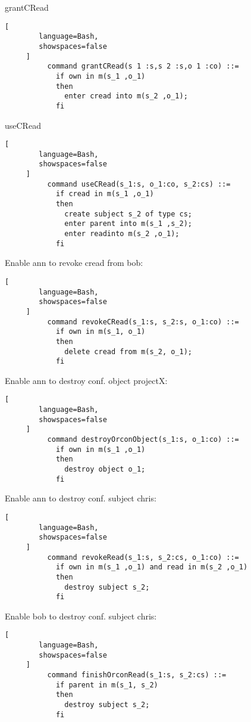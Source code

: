 \documentclass[a4paper]{article}
\begin{document}
\begin{multicols}{3}
\begin{itemize*}
        \item grantCRead
              \begin{lstlisting}[
        language=Bash,
        showspaces=false
     ]
          command grantCRead(s 1 :s,s 2 :s,o 1 :co) ::=
            if own in m(s_1 ,o_1)
            then
              enter cread into m(s_2 ,o_1);
            fi 
        \end{lstlisting}

        \item useCRead
              \begin{lstlisting}[
        language=Bash,
        showspaces=false
     ]
          command useCRead(s_1:s, o_1:co, s_2:cs) ::=
            if cread in m(s_1 ,o_1)
            then
              create subject s_2 of type cs;
              enter parent into m(s_1 ,s_2);
              enter readinto m(s_2 ,o_1);
            fi
        \end{lstlisting}

        \item Enable ann to revoke cread from bob:
              \begin{lstlisting}[
        language=Bash,
        showspaces=false
     ]
          command revokeCRead(s_1:s, s_2:s, o_1:co) ::=
            if own in m(s_1, o_1)
            then
              delete cread from m(s_2, o_1);
            fi
        \end{lstlisting}
        \item Enable ann to destroy conf. object projectX:
              \begin{lstlisting}[
        language=Bash,
        showspaces=false
     ]
          command destroyOrconObject(s_1:s, o_1:co) ::=
            if own in m(s_1 ,o_1)
            then
              destroy object o_1;
            fi 
        \end{lstlisting}
        \item Enable ann to destroy conf. subject chris:
              \begin{lstlisting}[
        language=Bash,
        showspaces=false
     ]
          command revokeRead(s_1:s, s_2:cs, o_1:co) ::= 
            if own in m(s_1 ,o_1) and read in m(s_2 ,o_1)
            then
              destroy subject s_2;
            fi
        \end{lstlisting}
        \item Enable bob to destroy conf. subject chris:
              \begin{lstlisting}[
        language=Bash,
        showspaces=false
     ]
          command finishOrconRead(s_1:s, s_2:cs) ::= 
            if parent in m(s_1, s_2)
            then
              destroy subject s_2;
            fi 
        \end{lstlisting}
    \end{itemize*}


\end{multicols}
\end{document}
